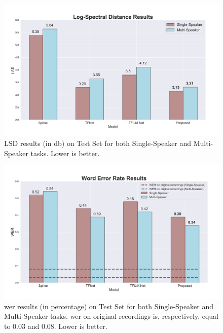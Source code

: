 \begin{figure}[!htb]
	\begin{center}
		\includegraphics[scale=0.4]{img/lsd_results.png}
		\caption{LSD results (in \gls{db}) on Test Set for both Single-Speaker and Multi-Speaker tasks. Lower is better.}
		\label{fig:lsd}
	\end{center}
\end{figure}

\begin{figure}[!htb]
	\begin{center}
		\includegraphics[scale=0.4]{img/wer_results.png}
		\caption{\gls{wer} results (in percentage) on Test Set for both Single-Speaker and Multi-Speaker tasks. \gls{wer} on original recordings is, respectively, equal to 0.03 and 0.08. Lower is better.}
		\label{fig:wer}
	\end{center}
\end{figure}

